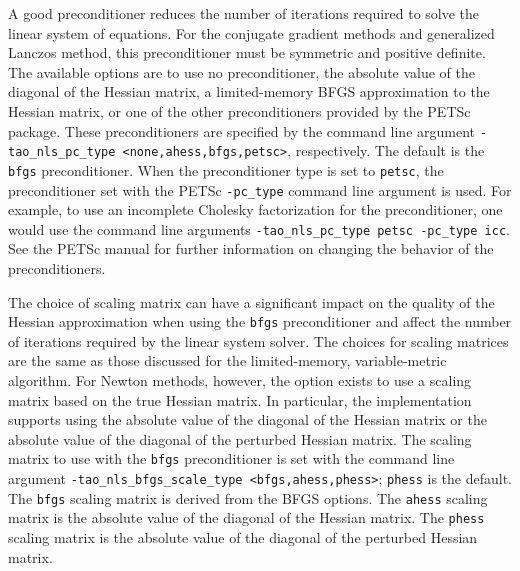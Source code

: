 A good preconditioner reduces the number of iterations required to
solve the linear system of equations.  For the conjugate gradient
methods and generalized Lanczos method, this preconditioner must be
symmetric and positive definite.  The available options are to use no
preconditioner, the absolute value of the diagonal of the Hessian
matrix, a limited-memory BFGS approximation to the Hessian matrix, or
one of the other preconditioners provided by the PETSc package.  These
preconditioners are specified by the command line argument 
{\tt -tao\_nls\_pc\_type <none,ahess,bfgs,petsc>}, respectively. The
default is the {\tt bfgs} preconditioner.  When the preconditioner
type is set to {\tt petsc}, the preconditioner set with the PETSc 
{\tt -pc\_type} command line argument is used.  For example, to use an
incomplete Cholesky factorization for the preconditioner, one would
use the command line arguments 
{\tt -tao\_nls\_pc\_type petsc -pc\_type icc}.  See the PETSc manual 
for further information on changing the behavior of the preconditioners.

The choice of scaling matrix can have a significant impact on the quality 
of the Hessian approximation when using the {\tt bfgs} preconditioner and
affect the number of iterations required by the linear system solver.
The choices for scaling matrices are the same as those discussed for 
the limited-memory, variable-metric algorithm.  For Newton methods,
however, the option exists to use a scaling matrix based on the true
Hessian matrix.  In particular, the implementation supports using the 
absolute value of the diagonal of the Hessian matrix or the absolute 
value of the diagonal of the perturbed Hessian matrix.  The scaling 
matrix to use with the {\tt bfgs} preconditioner is set with the 
command line argument {\tt -tao\_nls\_bfgs\_scale\_type <bfgs,ahess,phess>}; 
{\tt phess} is the default.  The {\tt bfgs} scaling matrix is derived from 
the BFGS options.  The {\tt ahess} scaling matrix is the absolute value of 
the diagonal of the Hessian matrix.  The {\tt phess} scaling matrix is
the absolute value of the diagonal of the perturbed Hessian matrix.

